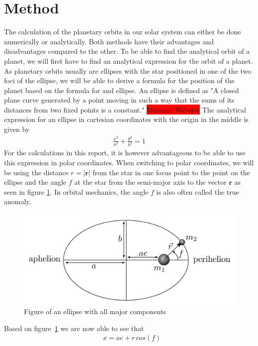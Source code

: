 \documentclass[reprint,english,notitlepage]{revtex4-2}
\begin{document}
\section{Method}
The calculation of the planetary orbits in our solar system can either be done numerically or analytically.
Both methods have their advantages and disadvantages compared to the other.
To be able to find the analytical orbit of a planet, we will first have to find an analytical expression for the orbit of a planet.
As planetary orbits usually are ellipses with the star positioned in one of the two foci of the ellipse, we will be able to derive a formula for the position of the planet based on the formula for and ellipse.
An ellipse is defined as "A closed plane curve generated by a point moving in such a way that the sums of its distances from two fixed points is a constant." \colorbox{red}{Merriam Webster}
The analytical expression for an ellipse in cartesian coordinates with the origin in the middle is given by
\begin{align}
    \frac{x^2}{a^2} + \frac{y^2}{b^2} = 1 \label{ellipse_analytic_cart}
\end{align}
For the calculations in this report, it is however advantageous to be able to use this expression in polar coordinates.
When switching to polar coordinates, we will be using the distance $r = |\textbf{r}|$ from the star in one focus point to the point on the ellipse and the angle $f$ at the star from the semi-major axis to the vector $\textbf{r}$ as seen in figure \ref{fig:Ellipse_fig}.
In orbital mechanics, the angle $f$ is also often called the true anomaly.
\begin{figure}[h]
	\centering
	\includegraphics[scale=0.3]{Figures/Ellipse}
	\caption{Figure of an ellipse with all major components}\label{fig:Ellipse_fig}
\end{figure}
Based on figure~\ref{fig:Ellipse_fig} we are now able to see that
\begin{align}
    &x = ae + r\,cos(f) \label{x_ellipse}
\end{align}
\end{document}
